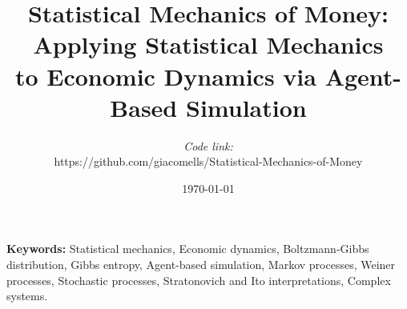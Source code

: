 \documentclass[10pt, a4paper, twocolumn]{article}
\title{
    \textbf{Statistical Mechanics of Money:} \\
    \large Applying Statistical Mechanics \\
    to Economic Dynamics via Agent-Based Simulation
}
\author{
    \textit{Code link:} \\
    https://github.com/giacomells/Statistical-Mechanics-of-Money
}
\date{\today}
\begin{document}
\maketitle
\noindent \textbf{Keywords:} Statistical mechanics, Economic dynamics, Boltzmann-Gibbs distribution, Gibbs entropy, Agent-based simulation, Markov processes, Weiner processes, Stochastic processes, Stratonovich and Ito interpretations, Complex systems.

\tableofcontents












\appendix

\newpage


\end{document}
